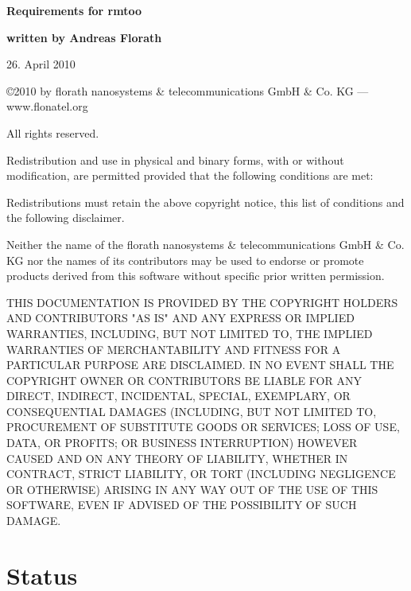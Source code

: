 \documentclass{article}
\begin{document}
\thispagestyle{empty}

\mbox{}

\vfill

{\LARGE\textbf{Requirements for rmtoo}}

\vfill

{\Large\textbf{written by Andreas Florath}}

\vfill

26. April 2010

\vfill

\newpage

\mbox{}

\vfill

{\small

\copyright 2010 by florath nanosystems \& telecommunications GmbH \& Co. KG
--- www.flonatel.org 

All rights reserved.

Redistribution and use in physical and binary forms, with or without
modification, are permitted provided that the following conditions are
met:

Redistributions must retain the above copyright notice, this list of
conditions and the following disclaimer.

Neither the name of the florath nanosystems \& telecommunications GmbH
\& Co. KG nor the names of its contributors may be used to endorse or
promote products derived from this software without specific prior
written permission.

THIS DOCUMENTATION IS PROVIDED BY THE COPYRIGHT HOLDERS AND
CONTRIBUTORS "AS IS" AND ANY EXPRESS OR IMPLIED WARRANTIES, INCLUDING,
BUT NOT LIMITED TO, THE IMPLIED WARRANTIES OF MERCHANTABILITY AND
FITNESS FOR A PARTICULAR PURPOSE ARE DISCLAIMED. IN NO EVENT SHALL THE
COPYRIGHT OWNER OR CONTRIBUTORS BE LIABLE FOR ANY DIRECT, INDIRECT,
INCIDENTAL, SPECIAL, EXEMPLARY, OR CONSEQUENTIAL DAMAGES (INCLUDING,
BUT NOT LIMITED TO, PROCUREMENT OF SUBSTITUTE GOODS OR SERVICES; LOSS
OF USE, DATA, OR PROFITS; OR BUSINESS INTERRUPTION) HOWEVER CAUSED AND
ON ANY THEORY OF LIABILITY, WHETHER IN CONTRACT, STRICT LIABILITY, OR
TORT (INCLUDING NEGLIGENCE OR OTHERWISE) ARISING IN ANY WAY OUT OF THE
USE OF THIS SOFTWARE, EVEN IF ADVISED OF THE POSSIBILITY OF SUCH
DAMAGE.
}
\newpage

\tableofcontents

\newpage

\section{Status}

\end{document}

